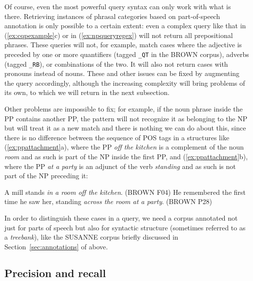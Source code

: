 Of course, even the most powerful query syntax can only work with what is there. Retrieving instances of phrasal categories based on part\hyp{}of\hyp{}speech annotation  is only possible to a certain extent: even a complex query like that in (\ref{ex:cqpexample}c) or in (\ref{ex:npqueryregex}) will not return all prepositional  phrases. These queries  will not, for example, match cases where the adjective  is preceded by one or more quantifiers (tagged  \texttt{\_QT} in the BROWN  corpus), adverbs  (tagged \texttt{\_RB}), or combinations of the two. It will also not return cases with pronouns  instead of nouns.  These and other issues can be fixed by augmenting the query accordingly, although the increasing complexity will bring problems of its own, to which we will return in the next subsection.

Other problems are impossible to fix; for example, if the noun  phrase inside the PP contains another PP, the pattern will not recognize it as belonging to the NP but will treat it as a new match and there is nothing we can do about this, since there is no difference between the sequence of POS tags in a structures like (\ref{ex:ppattachment}a), where the PP \textit{off the kitchen} is a complement of the noun \textit{room} and as such is part of the NP inside the first PP, and (\ref{ex:ppattachment}b), where the PP \textit{at a party} is an adjunct of the verb  \textit{standing} and as such is not part of the NP preceding it:

\begin{exe}
\ex
\begin{xlist}
\label{ex:ppattachment}
\ex A mill stands \textit{in a room off the kitchen}. (BROWN F04)
\ex He remembered the first time he saw her, standing \textit{across the room at a party}. (BROWN P28)
\end{xlist}
\end{exe}

In order to distinguish these cases in a query,  we need a corpus annotated  not just for parts of speech but also for syntactic  structure (sometimes referred to as a \textit{treebank}), like the SUSANNE corpus briefly discussed in Section~\ref{sec:annotations} of  above.


\subsection{Precision and recall}
\label{sec:precisionrecall}

